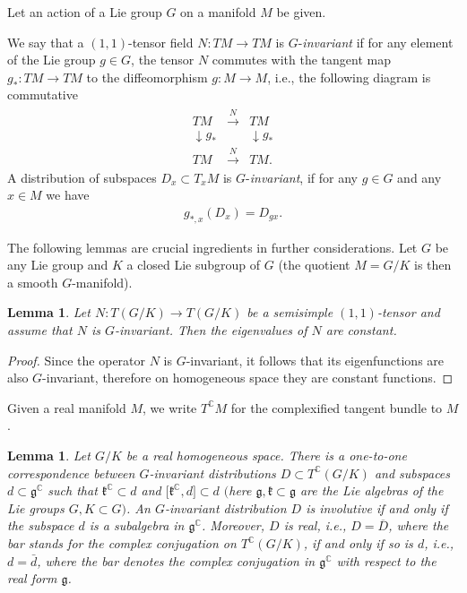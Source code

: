 \documentclass[11pt]{article}
\numberwithin{equation}{section}
\newtheorem{Lemma}[Theorem]{Lemma}
\begin{document}
Let an action of a Lie group $G$ on a manifold $M$ be given.

\begin{Definition}\label{def2}We say that a $(1,1)$-tensor field $N\colon TM\to TM$ is $G$-\emph{invariant} if for any element of the Lie group $ g\in G$, the tensor $N$ commutes with the tangent map $g_*\colon TM \to TM$ to the diffeomorphism $g\colon M\to M$, i.e., the following diagram is commutative
\begin{gather*}
\begin{matrix}
TM & \stackrel{N}{\longrightarrow}& TM \\
\downarrow g_*& & \downarrow g_* \\
TM &\stackrel{N}{\longrightarrow}&TM .
\end{matrix}
\end{gather*}
A distribution of subspaces $D_x \subset T_xM$ is $G$-\emph{invariant}, if for any $g\in G$ and any $x\in M$ we have
\begin{gather*}
g_{*,x}(D_x)=D_{gx}.
\end{gather*}
\end{Definition}

The following lemmas are crucial ingredients in further considerations. Let $G$ be any Lie group and $K$ a closed Lie subgroup of $G$ (the quotient $M=G/K$ is then a smooth $G$-manifold).

\begin{Lemma}\label{L1}Let $N\colon T(G/K) \to T(G/K)$ be a semisimple $(1,1)$-tensor and assume that $N$ is $G$-invariant. Then the eigenvalues of $N$ are constant.
\end{Lemma}
\begin{proof}Since the operator $N$ is $G$-invariant, it follows that its eigenfunctions are also $G$-invariant, therefore on homogeneous space they are constant functions.
\end{proof}

Given a real manifold $M$, we write $T^\mathbb{C} M$ for the complexified tangent bundle to $M$.

\begin{Lemma}\label{L3}Let $G/K$ be a real homogeneous space. There is a one-to-one correspondence between $G$-invariant distributions $D \subset T^\mathbb{C}(G/K)$ and subspaces $ d \subset\mathfrak{g}^\mathbb{C}$ such that $\mathfrak{k}^\mathbb{C} \subset d$ and $\big[\mathfrak{k}^\mathbb{C}, d\big]\subset d$ $($here $\mathfrak{g},\mathfrak{k} \subset\mathfrak{g}$ are the Lie algebras of the Lie groups $G, K \subset G)$. An $G$-invariant distribution $D$ is involutive if and only if the subspace $ d$ is a subalgebra in $\mathfrak{g}^\mathbb{C}$. Moreover, $D$ is real, i.e., $D=\overline D$, where the bar stands for the complex conjugation on $T^\mathbb{C}(G/K)$, if and only if so is $ d$, i.e., $d=\bar d$, where the bar denotes the complex conjugation in $\mathfrak{g}^\mathbb{C}$ with respect to the real form $\mathfrak{g}$.
\end{Lemma}
\end{document}
